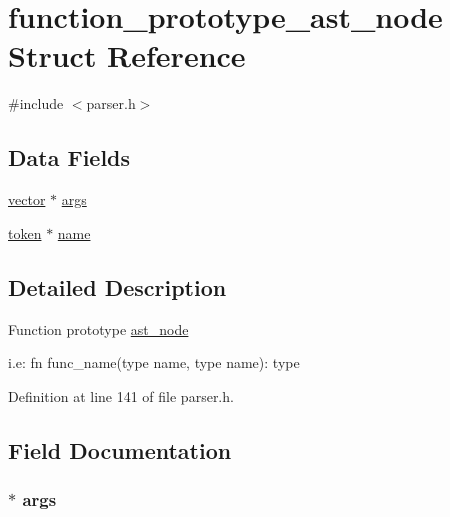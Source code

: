 \hypertarget{structfunction__prototype__ast__node}{\section{function\+\_\+prototype\+\_\+ast\+\_\+node Struct Reference}
\label{structfunction__prototype__ast__node}
}


{\ttfamily \#include $<$parser.\+h$>$}

\subsection*{Data Fields}
\begin{DoxyCompactItemize}
\item 
\hyperlink{structvector}{vector} $\ast$ \hyperlink{structfunction__prototype__ast__node_ac72a099d63034430cf03119307318f8f}{args}
\item 
\hyperlink{structtoken}{token} $\ast$ \hyperlink{structfunction__prototype__ast__node_a0be25b04f38aae29e2dd7c1b72d4797c}{name}
\end{DoxyCompactItemize}


\subsection{Detailed Description}
Function prototype \hyperlink{structast__node}{ast\+\_\+node}

i.\+e\+: fn func\+\_\+name(type name, type name)\+: type 

Definition at line 141 of file parser.\+h.



\subsection{Field Documentation}
\hypertarget{structfunction__prototype__ast__node_ac72a099d63034430cf03119307318f8f}{
\subsubsection[{args}]{$\ast$ args}}\label{structfunction__prototype__ast__node_ac72a099d63034430cf03119307318f8f}


